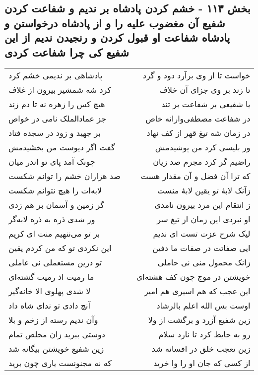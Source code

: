 \begin{center}
\section*{بخش ۱۱۳ - خشم کردن پادشاه بر ندیم و شفاعت کردن شفیع آن مغضوب علیه را و از پادشاه درخواستن و پادشاه شفاعت او قبول کردن و رنجیدن ندیم از این شفیع کی چرا شفاعت کردی}
\label{sec:sh113}
\begin{longtable}{l p{0.5cm} r}
پادشاهی بر ندیمی خشم کرد
&&
خواست تا از وی برآرد دود و گرد
\\
کرد شه شمشیر بیرون از غلاف
&&
تا زند بر وی جزای آن خلاف
\\
هیچ کس را زهره نه تا دم زند
&&
یا شفیعی بر شفاعت بر تند
\\
جز عمادالملک نامی در خواص
&&
در شفاعت مصطفی‌وارانه خاص
\\
بر جهید و زود در سجده فتاد
&&
در زمان شه تیغ قهر از کف نهاد
\\
گفت اگر دیوست من بخشیدمش
&&
ور بلیسی کرد من پوشیدمش
\\
چونک آمد پای تو اندر میان
&&
راضیم گر کرد مجرم صد زیان
\\
صد هزاران خشم را توانم شکست
&&
که ترا آن فضل و آن مقدار هست
\\
لابه‌ات را هیچ نتوانم شکست
&&
زآنک لابهٔ تو یقین لابهٔ منست
\\
گر زمین و آسمان بر هم زدی
&&
ز انتقام این مرد بیرون نامدی
\\
ور شدی ذره به ذره لابه‌گر
&&
او نبردی این زمان از تیغ سر
\\
بر تو می‌ننهیم منت ای کریم
&&
لیک شرح عزت تست ای ندیم
\\
این نکردی تو که من کردم یقین
&&
ایی صفاتت در صفات ما دفین
\\
تو درین مستعملی نی عاملی
&&
زانک محمول منی نی حاملی
\\
ما رمیت اذ رمیت گشته‌ای
&&
خویشتن در موج چون کف هشته‌ای
\\
لا شدی پهلوی الا خانه‌گیر
&&
این عجب که هم اسیری هم امیر
\\
آنچ دادی تو ندای شاه داد
&&
اوست بس الله اعلم بالرشاد
\\
وآن ندیم رسته از زخم و بلا
&&
زین شفیع آزرد و برگشت از ولا
\\
دوستی ببرید زان مخلص تمام
&&
رو به حایط کرد تا نارد سلام
\\
زین شفیع خویشتن بیگانه شد
&&
زین تعجب خلق در افسانه شد
\\
که نه مجنونست یاری چون برید
&&
از کسی که جان او را وا خرید
\\

\end{longtable}
\end{center}
